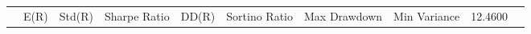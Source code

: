 \begin{tabular}{lrrrrrrrrr}
 & E(R) & Std(R) & Sharpe Ratio & DD(R) & Sortino Ratio & Max Drawdown & %
Min Variance & 12.4600%
\end{tabular}
